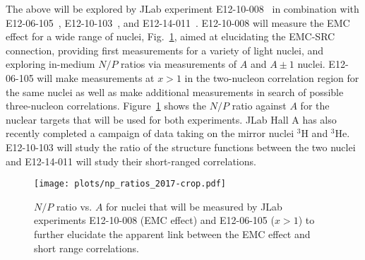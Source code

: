 The above will be explored by JLab experiment E12-10-008~\cite{12gev_emc} in combination
with E12-06-105~\cite{12gev_xgt1}, E12-10-103~\cite{mar}, and E12-14-011~\cite{tritsrc}. E12-10-008 will measure the EMC effect for a wide range of nuclei, Fig.~\ref{fig:np_ratios},
aimed at elucidating the EMC-SRC connection, providing first measurements for a variety of light nuclei,
and exploring in-medium $N/P$ ratios via measurements of $A$ and $A\pm1$ nuclei.  E12-06-105 will make
measurements at $x>1$ in the two-nucleon correlation region for the same nuclei as well as make additional
measurements in search of possible three-nucleon correlations. Figure~\ref{fig:np_ratios} shows the $N/P$
ratio against $A$ for the nuclear targets that will be used for both experiments.%
JLab Hall A has also recently completed a campaign of data taking on the mirror nuclei $^3$H and $^3$He. 
E12-10-103 will study the ratio of the structure functions between the two nuclei and 
E12-14-011 will study their short-ranged correlations.

\begin{figure}[tbp]
\texttt{[image: plots/np\_ratios\_2017-crop.pdf]}
\caption{$N/P$ ratio vs. $A$ for nuclei that will be measured by JLab experiments E12-10-008 (EMC effect) and E12-06-105 ($x>1$) to further elucidate the apparent link between the EMC effect and short range  correlations.}
\label{fig:np_ratios}
\end{figure}
